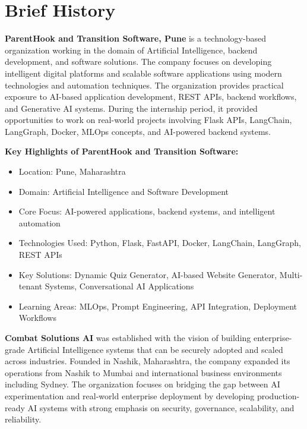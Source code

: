 \documentclass[12pt,a4paper]{report}
\begin{document}
\section{Brief History}

\textbf{ParentHook and Transition Software, Pune} is a technology-based organization working in the domain of Artificial Intelligence, backend development, and software solutions. The company focuses on developing intelligent digital platforms and scalable software applications using modern technologies and automation techniques. The organization provides practical exposure to AI-based application development, REST APIs, backend workflows, and Generative AI systems. During the internship period, it provided opportunities to work on real-world projects involving Flask APIs, LangChain, LangGraph, Docker, MLOps concepts, and AI-powered backend systems.

\noindent\textbf{Key Highlights of ParentHook and Transition Software:}
\begin{itemize}[leftmargin=1.5cm]
    \item Location: Pune, Maharashtra
    \item Domain: Artificial Intelligence and Software Development
    \item Core Focus: AI-powered applications, backend systems, and intelligent automation
    \item Technologies Used: Python, Flask, FastAPI, Docker, LangChain, LangGraph, REST APIs
    \item Key Solutions: Dynamic Quiz Generator, AI-based Website Generator, Multi-tenant Systems, Conversational AI Applications
    \item Learning Areas: MLOps, Prompt Engineering, API Integration, Deployment Workflows
\end{itemize}

\textbf{Combat Solutions AI} was established with the vision of building enterprise-grade Artificial Intelligence systems that can be securely adopted and scaled across industries. Founded in Nashik, Maharashtra, the company expanded its operations from Nashik to Mumbai and international business environments including Sydney. The organization focuses on bridging the gap between AI experimentation and real-world enterprise deployment by developing production-ready AI systems with strong emphasis on security, governance, scalability, and reliability.
\end{document}
